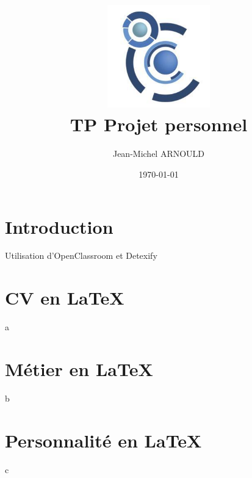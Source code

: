 \documentclass{report}
\title{
  \includegraphics[width=1.75in]{fst.jpg}\\
  \vspace*{1in}
  \textbf{TP Projet personnel}
}
\author{Jean-Michel ARNOULD}
\date{\today}
\begin{document}
\maketitle
\tableofcontents
{} 

\chapter*{Introduction}
Utilisation d'OpenClassroom\cite{oc} et Detexify\cite{detexify}
\chapter{CV en \LaTeX{}}
a
\chapter{Métier en \LaTeX{}}
b
\chapter{Personnalité en \LaTeX{}}
c



\end{document}
